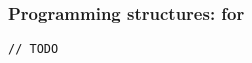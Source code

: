 \documentclass[11pt]{beamer}
\begin{document}
\begin{frame}[fragile]
\frametitle{Programming structures: for}
\begin{lstlisting}[language=lekta]
// TODO
\end{lstlisting}
\end{frame}

%
\end{document}
